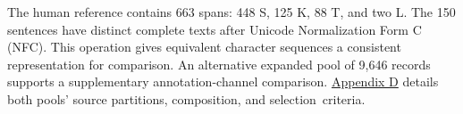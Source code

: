 The human reference contains 663 spans: 448 S, 125 K, 88 T, and two L. The 150 sentences have distinct complete texts after Unicode Normalization Form C (NFC). This operation gives equivalent character sequences a consistent representation for comparison. An alternative expanded pool of 9,646 records supports a supplementary annotation-channel comparison. \hyperref[app:d]{Appendix D} details both pools' source partitions, composition, and \mbox{selection criteria}.
